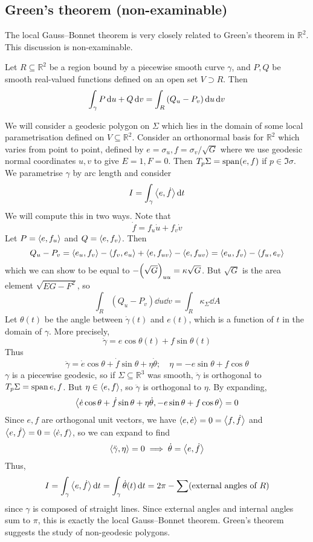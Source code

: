 \subsection{Green's theorem (non-examinable)}
The local Gauss--Bonnet theorem is very closely related to Green's theorem in \( \mathbb R^2 \).
This discussion is non-examinable.
\begin{theorem}
	Let \( R \subseteq \mathbb R^2 \) be a region bound by a piecewise smooth curve \( \gamma \), and \( P, Q \) be smooth real-valued functions defined on an open set \( V \supset R \).
	Then
	\[
		\int_\gamma P \dd{u}+ Q \dd{v} = \int_R \qty(Q_u - P_v) \dd{u} \dd{v}
	\]
\end{theorem}
We will consider a geodesic polygon on \( \Sigma \) which lies in the domain of some local parametrisation defined on \( V \subseteq \mathbb R^2 \).
Consider an orthonormal basis for \( \mathbb R^2 \) which varies from point to point, defined by \( e = \sigma_u, f = \sigma_v/\sqrt{G} \) where we use geodesic normal coordinates \( u,v \) to give \( E = 1, F = 0 \).
Then \( T_p \Sigma = \operatorname{span}(e,f) \) if \( p \in \Im \sigma \).
We parametrise \( \gamma \) by arc length and consider
\[
	I = \int_\gamma \left\langle{e,\dot f}\right\rangle \dd{t}
\]
We will compute this in two ways.
Note that
\[
	\dot f = f_u \dot u + f_v \dot v
\]
Let \( P = \left\langle{e,f_u}\right\rangle \) and \( Q = \left\langle{e,f_v}\right\rangle \).
Then
\[
	Q_u - P_v = \left\langle{e_u, f_v}\right\rangle - \left\langle{f_v, e_u}\right\rangle + \left\langle{e, f_{uv}}\right\rangle - \left\langle{e, f_{uv}}\right\rangle = \left\langle{e_u, f_v}\right\rangle - \left\langle{f_u, e_v}\right\rangle
\]
which we can show to be equal to \( -\qty(\sqrt{G})_{uu} = \kappa \sqrt{G} \).
But \( \sqrt{G} \) is the area element \( \sqrt{EG-F^2} \), so
\[
	\int_R (Q_u - P_v) \dd{u} \dd{v} = \int_R \kappa_\Sigma \dd{A}
\]
Let \( \theta(t) \) be the angle between \( \dot\gamma(t) \) and \( e(t) \), which is a function of \( t \) in the domain of \( \gamma \).
More precisely,
\[
	\dot \gamma = e \cos \theta(t) + f \sin \theta(t)
\]
Thus
\[
	\ddot \gamma = \dot e \cos \theta + \dot f \sin \theta + \eta \dot \theta;\quad \eta = -e\sin \theta + f \cos \theta
\]
\( \gamma \) is a piecewise geodesic, so if \( \Sigma \subseteq \mathbb R^3 \) was smooth, \( \ddot \gamma \) is orthogonal to \( T_p \Sigma = \operatorname{span}{e,f} \).
But \( \eta \in \left\langle{} e,f \right\rangle \), so \( \ddot \gamma \) is orthogonal to \( \eta \).
By expanding,
\[
	\left\langle{\dot e \cos \theta + \dot f \sin \theta + \eta \dot \theta, -e\sin\theta + f\cos \theta}\right\rangle = 0
\]
Since \( e, f \) are orthogonal unit vectors, we have \( \left\langle{e,\dot e}\right\rangle = 0 = \left\langle{f,\dot f}\right\rangle \) and \( \left\langle{e,\dot f}\right\rangle = 0 = \left\langle{\dot e, f}\right\rangle \), so we can expand to find
\[
	\left\langle{\ddot \gamma,\eta}\right\rangle = 0 \implies \dot \theta = \left\langle{e,\dot f}\right\rangle
\]
Thus,
\[
	I = \int_\gamma \left\langle{e,\dot f}\right\rangle \dd{t} = \int_\gamma \dot \theta(t) \dd{t} = 2\pi - \sum(\text{external angles of } R)
\]
since \( \gamma \) is composed of straight lines.
Since external angles and internal angles sum to \( \pi \), this is exactly the local Gauss--Bonnet theorem.
Green's theorem suggests the study of non-geodesic polygons.

